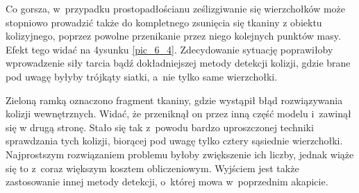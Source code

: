 		
		Co gorsza, w~przypadku prostopadłościanu ześlizgiwanie się wierzchołków może stopniowo prowadzić także do kompletnego zsunięcia się tkaniny z obiektu kolizyjnego, poprzez powolne przenikanie przez niego kolejnych punktów masy. Efekt tego widać na 4ysunku \ref{pic_6_4}. Zdecydowanie sytuację poprawiłoby wprowadzenie siły tarcia bądź dokładniejszej metody detekcji kolizji, gdzie brane pod uwagę byłyby trójkąty siatki, a~nie tylko same wierzchołki.
		
		Zieloną ramką oznaczono fragment tkaniny, gdzie wystąpił błąd rozwiązywania kolizji wewnętrznych. Widać, że przeniknął on przez inną część modelu i~zawinął się w drugą stronę. Stało się tak z~powodu bardzo uproszczonej techniki sprawdzania tych kolizji, biorącej pod uwagę tylko cztery sąsiednie wierzchołki. Najprostszym rozwiązaniem problemu byłoby zwiększenie ich liczby, jednak wiąże się to z~coraz większym kosztem obliczeniowym. Wyjściem jest także zastosowanie innej metody detekcji, o~której mowa w~poprzednim akapicie.
			
			
			

